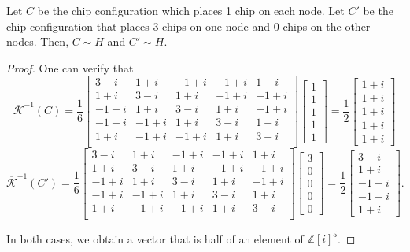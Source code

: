 \documentclass[10pt,a4paper]{amsart}
\begin{document}
\begin{lemma}\label{lem:half_vals} 
    Let $C$ be the chip configuration which places 1 chip on each node. Let $C'$ be the chip configuration that places $3$ chips on one node and $0$ chips on the other nodes. Then, $C \sim H$ and $C' \sim H$. 
\end{lemma}

\begin{proof}
    One can verify that 
    \begin{equation}\label{eq:half_proof}\overline{\mathcal K}^{-1}(C) = \frac 16\begin{bmatrix}
    3 - i & 1 + i & -1 + i & -1 + i & 1 + i \\
    1 + i & 3 - i & 1 + i & -1 + i & -1 + i \\
    -1 + i & 1 + i & 3 - i & 1 + i & -1 + i \\
    -1 + i & -1 + i & 1 + i & 3 - i & 1 + i \\
    1 + i & -1 + i & -1 + i & 1 + i & 3 - i \\
\end{bmatrix} \begin{bmatrix} 1 \\ 1 \\ 1 \\ 1 \\ 1\end{bmatrix}= \frac12\begin{bmatrix}1 + i\\ 1 + i\\ 1 + i\\ 1 + i\\ 1 + i\end{bmatrix}\end{equation}
\begin{equation}\label{eq:half_proof2}\overline{\mathcal K}^{-1}(C') = \frac 16\begin{bmatrix}
    3 - i & 1 + i & -1 + i & -1 + i & 1 + i \\
    1 + i & 3 - i & 1 + i & -1 + i & -1 + i \\
    -1 + i & 1 + i & 3 - i & 1 + i & -1 + i \\
    -1 + i & -1 + i & 1 + i & 3 - i & 1 + i \\
    1 + i & -1 + i & -1 + i & 1 + i & 3 - i \\
\end{bmatrix} \begin{bmatrix} 3 \\ 0 \\ 0 \\ 0 \\ 0\end{bmatrix}=\frac12\begin{bmatrix}3 -i\\ 1 + i\\ -1 + i\\ -1 + i\\ 1 + i\end{bmatrix}.\end{equation} 

In both cases, we obtain a vector that is half of an element of $\mathbb Z[i]^5$.  
\end{proof}
\end{document}
